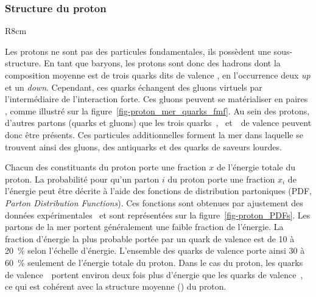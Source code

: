 \subsubsection{Structure du proton}
\begin{wrapfigure}{R}{8cm}
\centering

\vspace{\baselineskip}
\caption{Diagramme de Feynman de la propagation d'un proton avec apparition d'une paire \quark\antiquark.}
\label{fig-proton_mer_quarks_fmf}
\end{wrapfigure}
Les protons ne sont pas des particules fondamentales, ils possèdent une sous-structure.
En tant que baryons, les protons sont donc des hadrons dont la composition moyenne est de trois quarks dits \og de valence \fg{}, en l'occurrence deux \emph{up} et un \emph{down}.
Cependant, ces quarks échangent des gluons virtuels par l'intermédiaire de l'interaction forte.
Ces gluons peuvent se matérialiser en paires \quark\antiquark, comme illustré sur la figure~\ref{fig-proton_mer_quarks_fmf}.
Au sein des protons, d'autres partons (quarks et gluons) que les trois quarks~\quarku, \quarku\ et~\quarkd\ de valence peuvent donc être présents.
Ces particules additionnelles forment la \og mer \fg{} dans laquelle se trouvent ainsi des gluons, des antiquarks et des quarks de saveurs lourdes.
\par Chacun des constituants du proton porte une fraction $x$ de l'énergie totale du proton.
La probabilité pour qu'un parton $i$ du proton porte une fraction $x_i$ de l'énergie peut être décrite à l'aide des fonctions de distribution partoniques (PDF, \emph{Parton Distribution Functions}).
Ces fonctions sont obtenues par ajustement des données expérimentales~\cite{Gao_2018,Ball_2015} et sont représentées sur la figure~\ref{fig-proton_PDFs}.
Les partons de la mer portent généralement une faible fraction de l'énergie.
La fraction d'énergie la plus probable portée par un quark de valence est de \num{10} à \SI{20}{\%} selon l'échelle d'énergie.
L'ensemble des quarks de valence porte ainsi \num{30} à \SI{60}{\%} seulement de l'énergie totale du proton.
Dans le cas du proton, les quarks de valence~\quarku\ portent environ deux fois plus d'énergie que les quarks de valence~\quarkd, ce qui est cohérent avec la structure moyenne (\quarku\quarku\quarkd) du proton.
